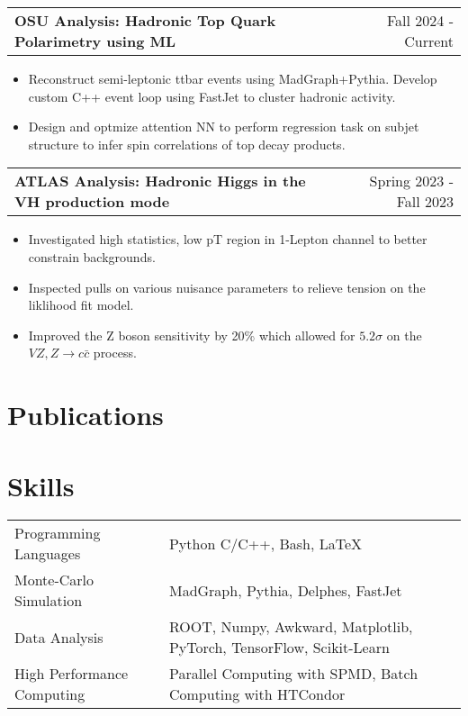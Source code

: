 \documentclass[a4paper,12pt]{article}
\makeatletter
\newenvironment{joblong}[2]
    {
    \begin{tabularx}{\linewidth}{@{}l X r@{}}
    \textbf{#1} & \hfill &  #2 \\[3.75pt]
    \end{tabularx}
    \begin{minipage}[t]{\linewidth}
    \begin{itemize}[nosep,after=\strut, leftmargin=1em, itemsep=2pt,label=--]
    }
    {
    \end{itemize}
    \end{minipage}
    }
\makeatother
\begin{document}
\begin{joblong}{OSU Analysis: Hadronic Top Quark Polarimetry using ML}{Fall 2024 - Current}
\item Reconstruct semi-leptonic ttbar events using MadGraph+Pythia. Develop custom C++ event loop using FastJet to cluster hadronic activity.
\item Design and optmize attention NN to perform regression task on subjet structure to infer spin correlations of top decay products.
\end{joblong}

\begin{joblong}{ATLAS Analysis: Hadronic Higgs in the VH production mode}{Spring 2023 - Fall 2023}
\item Investigated high statistics, low pT region in 1-Lepton channel to better constrain backgrounds.
\item Inspected pulls on various nuisance parameters to relieve tension on the liklihood fit model.
\item Improved the Z boson sensitivity by 20\% which allowed for $5.2\sigma$ on the $VZ, Z\rightarrow c\bar{c}$ process.
\end{joblong}

\section{Publications}
\begin{refsection}
\nocite{*}
\printbibliography[heading=none]
\end{refsection}

\section{Skills}
\begin{tabularx}{\linewidth}{@{}l X@{}}
Programming Languages &  \normalsize{Python C/C++, Bash, LaTeX}\\
Monte-Carlo Simulation &  \normalsize{MadGraph, Pythia, Delphes, FastJet}\\
Data Analysis &  \normalsize{ROOT, Numpy, Awkward, Matplotlib, PyTorch, TensorFlow, Scikit-Learn}\\
High Performance Computing &  \normalsize{Parallel Computing with SPMD, Batch Computing with HTCondor}\\
\end{tabularx}
\end{document}
